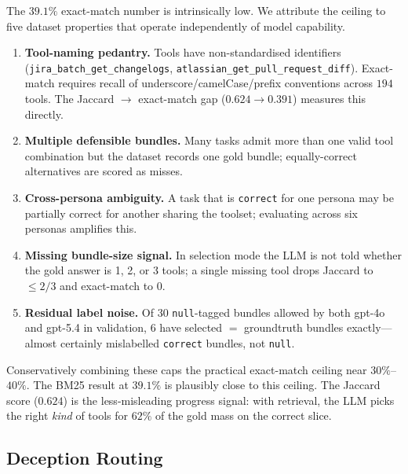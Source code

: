 \documentclass[10pt,a4paper,twocolumn]{article}
\begin{document}
The $39.1\%$ exact-match number is intrinsically low. We attribute the ceiling to five dataset properties that operate independently of model capability.
\begin{enumerate}
  \item \textbf{Tool-naming pedantry.} Tools have non-standardised identifiers (\texttt{jira\_batch\_get\_changelogs}, \texttt{atlassian\_get\_pull\_request\_diff}). Exact-match requires recall of underscore/camelCase/prefix conventions across $194$ tools. The Jaccard $\to$ exact-match gap ($0.624 \to 0.391$) measures this directly.
  \item \textbf{Multiple defensible bundles.} Many tasks admit more than one valid tool combination but the dataset records one gold bundle; equally-correct alternatives are scored as misses.
  \item \textbf{Cross-persona ambiguity.} A task that is \texttt{correct} for one persona may be partially correct for another sharing the toolset; evaluating across six personas amplifies this.
  \item \textbf{Missing bundle-size signal.} In selection mode the LLM is not told whether the gold answer is 1, 2, or 3 tools; a single missing tool drops Jaccard to $\leq 2/3$ and exact-match to $0$.
  \item \textbf{Residual label noise.} Of $30$ \texttt{null}-tagged bundles allowed by both gpt-4o and gpt-5.4 in validation, $6$ have selected $=$ groundtruth bundles exactly---almost certainly mislabelled \texttt{correct} bundles, not \texttt{null}.
\end{enumerate}
Conservatively combining these caps the practical exact-match ceiling near $30\%$--$40\%$. The BM25 result at $39.1\%$ is plausibly close to this ceiling. The Jaccard score ($0.624$) is the less-misleading progress signal: with retrieval, the LLM picks the right \emph{kind} of tools for $62\%$ of the gold mass on the correct slice.

\subsection{Deception Routing}
\label{sec:deception_results}
\end{document}
